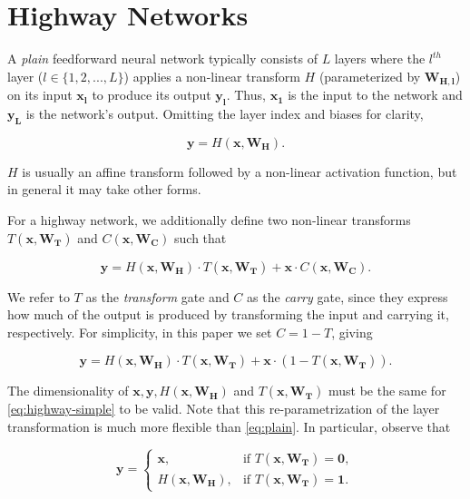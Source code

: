 \documentclass{article}
\renewcommand{\vec}[1]{\mathbf{#1}}
\begin{document}
\section{Highway Networks}

A \emph{plain} feedforward neural network typically consists of $L$ layers where the $l^{th}$ layer ($l \in \{1, 2, ..., L\}$) applies a non-linear transform $H$ (parameterized by $\vec{W_{H,l}}$) on its input $\vec{x_l}$ to produce its output $\vec{y_l}$. Thus, $\vec{x_1}$ is the input to the network and $\vec{y_L}$ is the network's output. Omitting the layer index and biases for clarity,

\begin{equation}\label{eq:plain}
\vec{y} = H(\vec{x}, \vec{W_H}).
\end{equation}

$H$ is usually an affine transform followed by a non-linear activation function, but in general it may take other forms.

For a highway network, we additionally define two non-linear transforms $T(\vec{x}, \vec{W_T})$ and $C(\vec{x}, \vec{W_C})$ such that

\begin{equation}\label{eq:highway}
\vec{y} = H(\vec{x}, \vec{W_H}) \cdotp T(\vec{x}, \vec{W_T}) + \vec{x} \cdot C(\vec{x}, \vec{W_C}).
\end{equation}

We refer to $T$ as the \emph{transform} gate and $C$ as the \emph{carry} gate, since they express how much of the output is produced by transforming the input and carrying it, respectively. For simplicity, in this paper we set $C = 1 - T$, giving

\begin{equation}\label{eq:highway-simple}
\vec{y} = H(\vec{x}, \vec{W_H}) \cdotp T(\vec{x}, \vec{W_T}) + \vec{x} \cdot (1 - T(\vec{x}, \vec{W_T})).
\end{equation}

The dimensionality of $\vec{x}, \vec{y}, H(\vec{x}, \vec{W_H})$ and $T(\vec{x}, \vec{W_T})$ must be the same for \autoref{eq:highway-simple} to be valid.
Note that this re-parametrization of the layer transformation is much more flexible than \autoref{eq:plain}. 
In particular, observe that 

\begin{equation}\label{eq:highway-conditions}
\vec{y} = 
\begin{cases}
	\vec{x}, &\text{if } T(\vec{x}, \vec{W_T}) = \mathbf{0},\\
	H(\vec{x}, \vec{W_H}), &\text{if } T(\vec{x}, \vec{W_T}) = \mathbf{1}.
\end{cases}
\end{equation}
\end{document}
